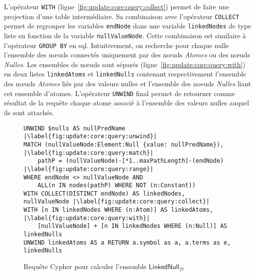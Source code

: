 L'opérateur \verb|WITH| (ligne~\ref{fig:update:core:query:collect}) permet de faire une projection d'une table intermédiaire.
Sa combinaison avec l'opérateur \verb|COLLECT| permet de regrouper les variables \verb|endNode| dans une variable \verb|linkedNodes| de type liste en fonction de la variable \verb|nullValueNode|.
Cette combinaison est similaire à l'opérateur \verb|GROUP BY| en \gls{sql}.
Intuitivement, on recherche pour chaque nulle l'ensemble des nœuds connectés uniquement par des nœuds \textit{Atomes} ou des nœuds \textit{Nulles}.
Les ensembles de nœuds sont séparés (ligne~\ref{fig:update:core:query:with}) en deux listes \verb|linkedAtoms| et \verb|linkedNulls| contenant respectivement l'ensemble des nœuds \textit{Atomes} liés par des valeurs nulles et l'ensemble des noeuds \textit{Nulles} liant cet ensemble d'atomes.
L'opérateur \verb|UNWIND| final permet de retourner comme résultat de la requête chaque atome associé à l'ensemble des valeurs nulles auquel ils sont attachés.

\begin{figure}[htb]
	\begin{lstlisting}[escapechar=|]
UNWIND $nulls AS nullPredName |\label{fig:update:core:query:unwind}|
MATCH (nullValueNode:Element:Null {value: nullPredName}), |\label{fig:update:core:query:match}|
	pathP = (nullValueNode)-[*1..maxPathLength]-(endNode) |\label{fig:update:core:query:range}|
WHERE endNode <> nullValueNode AND
	ALL(n IN nodes(pathP) WHERE NOT (n:Constant))
WITH COLLECT(DISTINCT endNode) AS linkedNodes, nullValueNode |\label{fig:update:core:query:collect}|
WITH [n IN linkedNodes WHERE (n:Atom)] AS linkedAtoms, |\label{fig:update:core:query:with}|
	[nullValueNode] + [n IN linkedNodes WHERE (n:Null)] AS linkedNulls
UNWIND linkedAtoms AS a RETURN a.symbol as a, a.terms as e, linkedNulls
	\end{lstlisting}
	\caption{Requête Cypher pour calculer l'ensemble $\textsf{LinkedNull}_{\mathcal{D}}$}
	\label{fig:update:core:query}
\end{figure}

